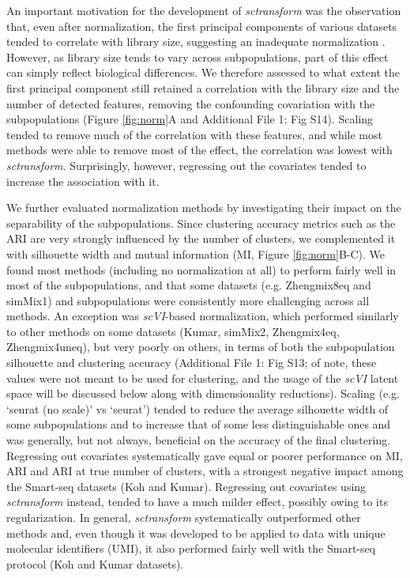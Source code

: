 \documentclass{bmcart}
\begin{document}
An important motivation for the development of \textit{sctransform} was the observation that, even after normalization, the first principal components of various datasets tended to correlate with library size, suggesting an inadequate normalization \cite{hafemeisterSCtransform2019}. However, as library size tends to vary across subpopulations, part of this effect can simply reflect biological differences. We therefore assessed to what extent the first principal component still retained a correlation with the library size and the number of detected features, removing the confounding covariation with the subpopulations (Figure \ref{fig:norm}A and Additional File 1: Fig S14). Scaling tended to remove much of the correlation with these features, and while most methods were able to remove most of the effect, the correlation was lowest with \textit{sctransform}. Surprisingly, however, regressing out the covariates tended to increase the association with it.

We further evaluated normalization methods by investigating their impact on the separability of the subpopulations. Since clustering accuracy metrics such as the ARI are very strongly influenced by the number of clusters, we complemented it with silhouette width \cite{RousseeuwSil1987} and mutual information (MI, Figure \ref{fig:norm}B-C). We found most methods (including no normalization at all) to perform fairly well in most of the subpopulations, and that some datasets (e.g. Zhengmix8eq and simMix1) and subpopulations were consistently more challenging across all methods. An exception was \textit{scVI}-based normalization, which performed similarly to other methods on some datasets (Kumar, simMix2, Zhengmix4eq, Zhengmix4uneq), but very poorly on others, in terms of both the subpopulation silhouette and clustering accuracy (Additional File 1: Fig S13; of note, these values were not meant to be used for clustering, and the usage of the \textit{scVI} latent space will be discussed below along with dimensionality reductions). Scaling (e.g. `seurat (no scale)' vs `seurat') tended to reduce the average silhouette width of some subpopulations and to increase that of some less distinguishable ones and was generally, but not always, beneficial on the accuracy of the final clustering. Regressing out covariates systematically gave equal or poorer performance on MI, ARI and ARI at true number of clusters, with a strongest negative impact among the Smart-seq datasets (Koh and Kumar). Regressing out covariates using \textit{sctransform} instead, tended to have a much milder effect, possibly owing to its regularization. In general, \textit{sctransform} systematically outperformed other methods and, even though it was developed to be applied to data with unique molecular identifiers (UMI), it also performed fairly well with the Smart-seq protocol (Koh and Kumar datasets).
\end{document}
